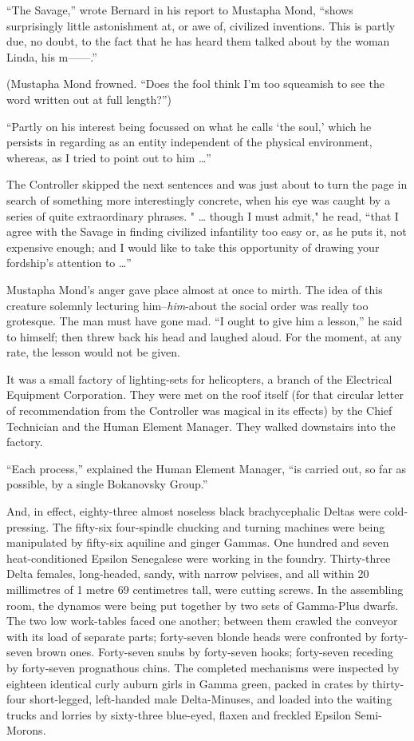 \documentclass[12pt]{report}
\begin{document}
``The Savage,'' wrote Bernard in his report to Mustapha Mond, ``shows
surprisingly little astonishment at, or awe of, civilized inventions.
This is partly due, no doubt, to the fact that he has heard them talked
about by the woman Linda, his m------.''

(Mustapha Mond frowned. ``Does the fool think I'm too squeamish to see
the word written out at full length?'')

``Partly on his interest being focussed on what he calls `the soul,'
which he persists in regarding as an entity independent of the physical
environment, whereas, as I tried to point out to him \ldots{}''

The Controller skipped the next sentences and was just about to turn the
page in search of something more interestingly concrete, when his eye
was caught by a series of quite extraordinary phrases. " \ldots{} though
I must admit," he read, ``that I agree with the Savage in finding
civilized infantility too easy or, as he puts it, not expensive enough;
and I would like to take this opportunity of drawing your fordship's
attention to \ldots{}''

Mustapha Mond's anger gave place almost at once to mirth. The idea of
this creature solemnly lecturing him--\emph{him}-about the social order
was really too grotesque. The man must have gone mad. ``I ought to give
him a lesson,'' he said to himself; then threw back his head and laughed
aloud. For the moment, at any rate, the lesson would not be given.

It was a small factory of lighting-sets for helicopters, a branch of the
Electrical Equipment Corporation. They were met on the roof itself (for
that circular letter of recommendation from the Controller was magical
in its effects) by the Chief Technician and the Human Element Manager.
They walked downstairs into the factory.

``Each process,'' explained the Human Element Manager, ``is carried out,
so far as possible, by a single Bokanovsky Group.''

And, in effect, eighty-three almost noseless black brachycephalic Deltas
were cold-pressing. The fifty-six four-spindle chucking and turning
machines were being manipulated by fifty-six aquiline and ginger Gammas.
One hundred and seven heat-conditioned Epsilon Senegalese were working
in the foundry. Thirty-three Delta females, long-headed, sandy, with
narrow pelvises, and all within 20 millimetres of 1 metre 69 centimetres
tall, were cutting screws. In the assembling room, the dynamos were
being put together by two sets of Gamma-Plus dwarfs. The two low
work-tables faced one another; between them crawled the conveyor with
its load of separate parts; forty-seven blonde heads were confronted by
forty-seven brown ones. Forty-seven snubs by forty-seven hooks;
forty-seven receding by forty-seven prognathous chins. The completed
mechanisms were inspected by eighteen identical curly auburn girls in
Gamma green, packed in crates by thirty-four short-legged, left-handed
male Delta-Minuses, and loaded into the waiting trucks and lorries by
sixty-three blue-eyed, flaxen and freckled Epsilon Semi-Morons.
\end{document}
